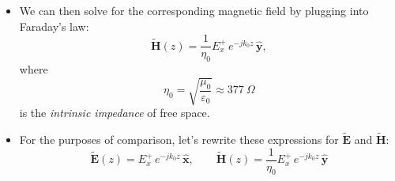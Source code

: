 \documentclass[11pt, oneside]{article}
\begin{document}
\begin{itemize}
	\begin{equation}
		\label{e:helm_z}
		\frac{\partial^2 \tilde{E}_x}{\partial z^2} + k_0^2 \tilde{E}_x = 0,
	\end{equation}
	for which the solution for a wave propagating along $+\hat{\mathbf{z}}$ is
	\begin{equation}
		\tilde{E}_x(z) = E_x^+\,e^{-jk_0z}
		\qquad \text{or} \qquad
		\tilde{\mathbf{E}}(z) = E_x^+\,e^{-jk_0z}\,\hat{\mathbf{x}}.
	\end{equation}
	The superscript $+$ labels the wave traveling in the $+\hat{\mathbf{z}}$ direction, and $E_x^+$ is its (constant, complex) amplitude at $z = 0$. Eq.~\eqref{e:helm_z} is second order, so its general solution has two terms, $\tilde{E}_x(z) = E_x^+e^{-jk_0z} + E_x^-e^{+jk_0z}$. To see which way each travels, write $E_x^+ = |E_x^+|e^{j\phi^+}$ and return to the time domain: $E_x(z,t) = \mathrm{Re}[E_x^+e^{-jk_0z}e^{j\omega t}] = |E_x^+|\cos(\omega t - k_0z + \phi^+)$. A point of constant phase, $\omega t - k_0z = \text{const}$, moves toward $+z$ as $t$ increases, at speed $\omega/k_0 = c$. Likewise, the $E_x^-$ term moves toward $-z$. Here we consider only the wave traveling along $+\hat{\mathbf{z}}$; we will need both terms when we study reflection at interfaces (Lecture 4).
	\item We can then solve for the corresponding magnetic field by plugging into Faraday's law:
	\begin{equation}
		\tilde{\mathbf{H}}(z) = \frac{1}{\eta_0}E_x^+\,e^{-jk_0z}\,\hat{\mathbf{y}},
	\end{equation}
	where
	\begin{equation}
		\eta_0 = \sqrt{\frac{\mu_0}{\varepsilon_0}} \approx 377\ \Omega
	\end{equation}
	is the \emph{intrinsic impedance} of free space.
	\item For the purposes of comparison, let's rewrite these expressions for $\tilde{\mathbf{E}}$ and $\tilde{\mathbf{H}}$:
	\begin{equation}
		\label{e:plane_free}
		\boxed{
		\tilde{\mathbf{E}}(z) = E_x^+\,e^{-jk_0z}\,\hat{\mathbf{x}},
		\qquad
		\tilde{\mathbf{H}}(z) = \frac{1}{\eta_0}E_x^+\,e^{-jk_0z}\,\hat{\mathbf{y}}
		}
	\end{equation}
\end{itemize}
\end{document}

